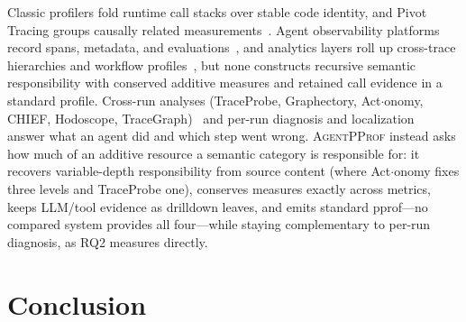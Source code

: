 \documentclass[letterpaper]{article}
\newcommand{\sys}{\textsc{AgentPProf}\xspace}
\begin{document}
Classic profilers fold runtime call stacks over stable code identity, and Pivot Tracing groups causally related measurements~\cite{pprof,flamegraphs,pivottracing}.
Agent observability platforms record spans, metadata, and evaluations~\cite{langsmith,langfuse,otel,datadog-llmobs}, and analytics layers roll up cross-trace hierarchies and workflow profiles~\cite{datadog-patterns,langsmith-insights,nemo-agent-toolkit-profiler,otel-profiles}, but none constructs recursive semantic responsibility with conserved additive measures and retained call evidence in a standard profile.
Cross-run analyses (TraceProbe, Graphectory, Act$\cdot$onomy, CHIEF, Hodoscope, TraceGraph)~\cite{traceprobe2026,graphectory2026,actonomy2026,chief2026,hodoscope2026,tracegraph2026} and per-run diagnosis and localization~\cite{agentrx,li2026codetracer,agentprocessbench,hintbench,traceelephant,mpbench2026} answer what an agent did and which step went wrong.
\sys instead asks how much of an additive resource a semantic category is responsible for: it recovers variable-depth responsibility from source content (where Act$\cdot$onomy fixes three levels and TraceProbe one), conserves measures exactly across metrics, keeps LLM/tool evidence as drilldown leaves, and emits standard pprof---no compared system provides all four---while staying complementary to per-run diagnosis, as RQ2 measures directly.

\section{Conclusion}
\end{document}
